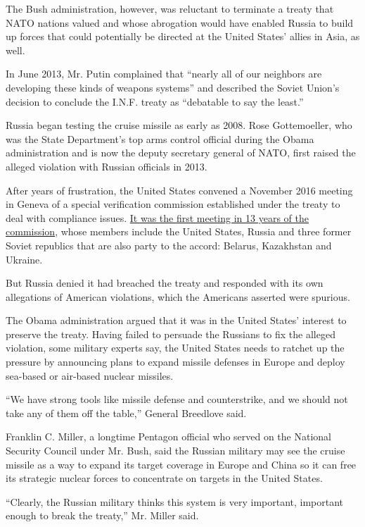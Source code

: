 The Bush administration, however, was reluctant to terminate a treaty
that NATO nations valued and whose abrogation would have enabled Russia
to build up forces that could potentially be directed at the United
States' allies in Asia, as well.

In June 2013, Mr. Putin complained that ``nearly all of our neighbors
are developing these kinds of weapons systems'' and described the Soviet
Union's decision to conclude the I.N.F. treaty as ``debatable to say the
least.''

Russia began testing the cruise missile as early as 2008. Rose
Gottemoeller, who was the State Department's top arms control official
during the Obama administration and is now the deputy secretary general
of NATO, first raised the alleged violation with Russian officials in
2013.

After years of frustration, the United States convened a November 2016
meeting in Geneva of a special verification commission established under
the treaty to deal with compliance issues.
\href{https://www.nytimes.com/2016/10/20/world/europe/russia-missiles-inf-treaty.html}{It
was the first meeting in 13 years of the commission}, whose members
include the United States, Russia and three former Soviet republics that
are also party to the accord: Belarus, Kazakhstan and Ukraine.

But Russia denied it had breached the treaty and responded with its own
allegations of American violations, which the Americans asserted were
spurious.

The Obama administration argued that it was in the United States'
interest to preserve the treaty. Having failed to persuade the Russians
to fix the alleged violation, some military experts say, the United
States needs to ratchet up the pressure by announcing plans to expand
missile defenses in Europe and deploy sea-based or air-based nuclear
missiles.

``We have strong tools like missile defense and counterstrike, and we
should not take any of them off the table,'' General Breedlove said.

Franklin C. Miller, a longtime Pentagon official who served on the
National Security Council under Mr. Bush, said the Russian military may
see the cruise missile as a way to expand its target coverage in Europe
and China so it can free its strategic nuclear forces to concentrate on
targets in the United States.

``Clearly, the Russian military thinks this system is very important,
important enough to break the treaty,'' Mr. Miller said.

